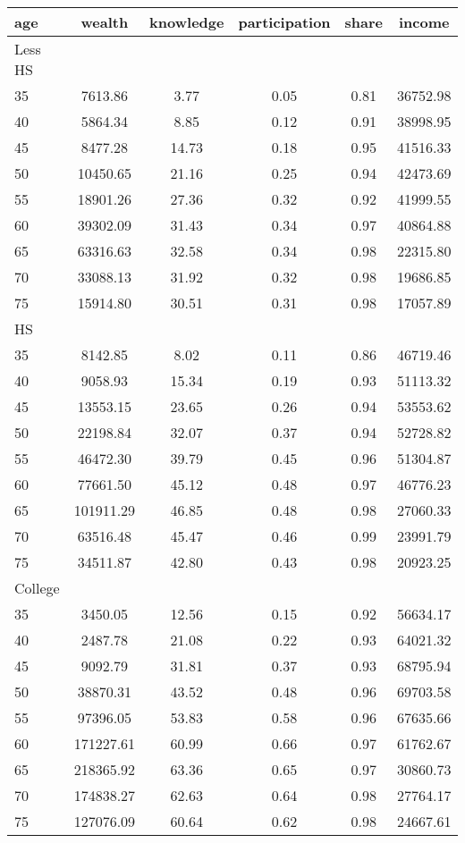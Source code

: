  \begin{tabular}{lccccc}
 \hline \hline
  age & wealth & knowledge & participation & share & income \\
 \hline
 Less HS & & & & & \\
 \hline
35 &   7613.86 &      3.77 &      0.05 &      0.81 &  36752.98 \\ 
40 &   5864.34 &      8.85 &      0.12 &      0.91 &  38998.95 \\ 
45 &   8477.28 &     14.73 &      0.18 &      0.95 &  41516.33 \\ 
50 &  10450.65 &     21.16 &      0.25 &      0.94 &  42473.69 \\ 
55 &  18901.26 &     27.36 &      0.32 &      0.92 &  41999.55 \\ 
60 &  39302.09 &     31.43 &      0.34 &      0.97 &  40864.88 \\ 
65 &  63316.63 &     32.58 &      0.34 &      0.98 &  22315.80 \\ 
70 &  33088.13 &     31.92 &      0.32 &      0.98 &  19686.85 \\ 
75 &  15914.80 &     30.51 &      0.31 &      0.98 &  17057.89 \\ 
 \hline
 HS & & & & & \\
 \hline
35 &   8142.85 &      8.02 &      0.11 &      0.86 &  46719.46 \\ 
40 &   9058.93 &     15.34 &      0.19 &      0.93 &  51113.32 \\ 
45 &  13553.15 &     23.65 &      0.26 &      0.94 &  53553.62 \\ 
50 &  22198.84 &     32.07 &      0.37 &      0.94 &  52728.82 \\ 
55 &  46472.30 &     39.79 &      0.45 &      0.96 &  51304.87 \\ 
60 &  77661.50 &     45.12 &      0.48 &      0.97 &  46776.23 \\ 
65 & 101911.29 &     46.85 &      0.48 &      0.98 &  27060.33 \\ 
70 &  63516.48 &     45.47 &      0.46 &      0.99 &  23991.79 \\ 
75 &  34511.87 &     42.80 &      0.43 &      0.98 &  20923.25 \\ 
 \hline
 College & & & & & \\
 \hline
35 &   3450.05 &     12.56 &      0.15 &      0.92 &  56634.17 \\ 
40 &   2487.78 &     21.08 &      0.22 &      0.93 &  64021.32 \\ 
45 &   9092.79 &     31.81 &      0.37 &      0.93 &  68795.94 \\ 
50 &  38870.31 &     43.52 &      0.48 &      0.96 &  69703.58 \\ 
55 &  97396.05 &     53.83 &      0.58 &      0.96 &  67635.66 \\ 
60 & 171227.61 &     60.99 &      0.66 &      0.97 &  61762.67 \\ 
65 & 218365.92 &     63.36 &      0.65 &      0.97 &  30860.73 \\ 
70 & 174838.27 &     62.63 &      0.64 &      0.98 &  27764.17 \\ 
75 & 127076.09 &     60.64 &      0.62 &      0.98 &  24667.61 \\ 
 \hline \hline
 \end{tabular}
